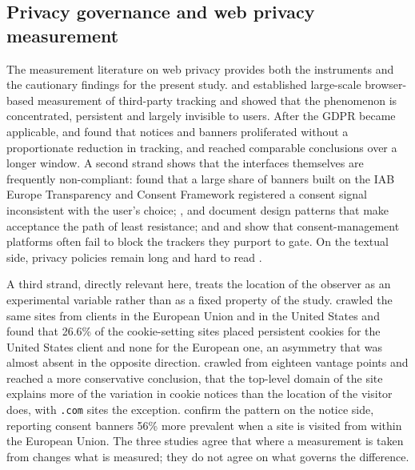 \documentclass[pdflatex,sn-basic,Numbered]{sn-jnl}
\theoremstyle{thmstyleone}
\theoremstyle{thmstyletwo}
\theoremstyle{thmstylethree}
\begin{document}
\subsection{Privacy governance and web privacy measurement}\label{sec:related-privacy}

The measurement literature on web privacy provides both the instruments and the cautionary findings for the present study. \citet{libert2015exposing} and \citet{englehardt2016online} established large-scale browser-based measurement of third-party tracking and showed that the phenomenon is concentrated, persistent and largely invisible to users. After the GDPR became applicable, \citet{degeling2019value} and \citet{trevisan2019four} found that notices and banners proliferated without a proportionate reduction in tracking, and \citet{kretschmer2021cookie} reached comparable conclusions over a longer window. A second strand shows that the interfaces themselves are frequently non-compliant: \citet{matte2020cookie} found that a large share of banners built on the IAB Europe Transparency and Consent Framework registered a consent signal inconsistent with the user's choice; \citet{nouwens2020dark}, \citet{gray2021dark} and \citet{habib2022okay} document design patterns that make acceptance the path of least resistance; and \citet{sanchezrola2019can} and \citet{bollinger2022automating} show that consent-management platforms often fail to block the trackers they purport to gate. On the textual side, privacy policies remain long and hard to read \citep{fabian2017largescale,belcheva2023understanding}.

A third strand, directly relevant here, treats the location of the observer as an experimental variable rather than as a fixed property of the study. \citet{dabrowski2019measuring} crawled the same sites from clients in the European Union and in the United States and found that 26.6\% of the cookie-setting sites placed persistent cookies for the United States client and none for the European one, an asymmetry that was almost absent in the opposite direction. \citet{vaneijk2019impact} crawled from eighteen vantage points and reached a more conservative conclusion, that the top-level domain of the site explains more of the variation in cookie notices than the location of the visitor does, with \texttt{.com} sites the exception. \citet{rasaii2023exploring} confirm the pattern on the notice side, reporting consent banners 56\% more prevalent when a site is visited from within the European Union. The three studies agree that where a measurement is taken from changes what is measured; they do not agree on what governs the difference.
\end{document}

